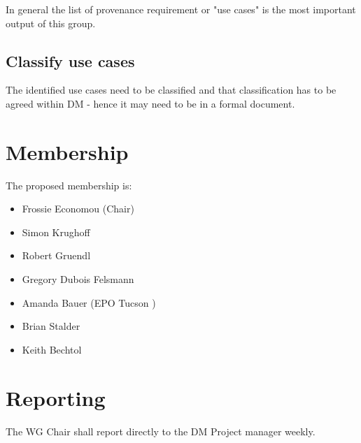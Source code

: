 In general the list of \gls{provenance} requirement or  "use cases"  is the most important output of this group.
\subsection{Classify use cases}
The identified use cases need to be classified and that classification has to be agreed within \gls{DM} - hence it may need to be in a formal document.



\section{Membership}

The proposed membership is:

\begin{itemize}
    \item Frossie Economou (Chair)
    \item Simon Krughoff
    \item Robert Gruendl
    \item Gregory Dubois Felsmann
    \item Amanda Bauer (\gls{EPO} Tucson )
    \item Brian Stalder
    \item Keith Bechtol
\end{itemize}


\section{Reporting}

The \gls{WG} Chair shall report directly to the \gls{DM} Project manager weekly.
